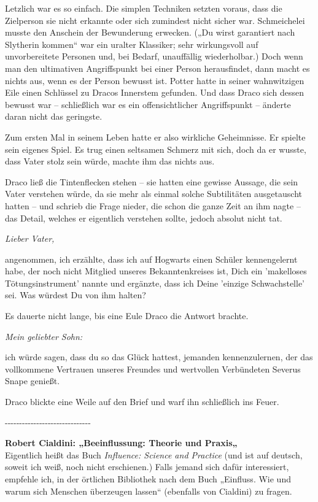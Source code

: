 {Letzlich war es so einfach. Die simplen Techniken setzten voraus, dass die Zielperson sie nicht erkannte oder sich zumindest nicht sicher war. Schmeichelei musste den Anschein der Bewunderung erwecken. („Du wirst garantiert nach Slytherin kommen“ war ein uralter Klassiker; sehr wirkungsvoll auf unvorbereitete Personen und, bei Bedarf, unauffällig wiederholbar.) Doch wenn man den ultimativen Angriffspunkt bei einer Person herausfindet, dann macht es nichts aus, wenn es der Person bewusst ist. Potter hatte in seiner wahnwitzigen Eile einen Schlüssel zu Dracos Innerstem gefunden. Und dass Draco sich dessen bewusst war -- schließlich war es ein offensichtlicher Angriffspunkt -- änderte daran nicht das geringste.

Zum ersten Mal in seinem Leben hatte er also wirkliche Geheimnisse. Er spielte sein eigenes Spiel. Es trug einen seltsamen Schmerz mit sich, doch da er wusste, dass Vater stolz sein würde, machte ihm das nichts aus.

Draco ließ die Tintenflecken stehen -- sie hatten eine gewisse Aussage, die sein Vater verstehen würde, da sie mehr als einmal solche Subtilitäten ausgetauscht hatten -- und schrieb die Frage nieder, die schon die ganze Zeit an ihm nagte -- das Detail, welches er eigentlich verstehen sollte, jedoch absolut nicht tat.

\emph{Lieber Vater,}

angenommen, ich erzählte, dass ich auf Hogwarts einen Schüler kennengelernt habe, der noch nicht Mitglied unseres Bekanntenkreises ist, Dich ein 'makelloses Tötungsinstrument' nannte und ergänzte, dass ich Deine 'einzige Schwachstelle' sei. Was würdest Du von ihm halten?

Es dauerte nicht lange, bis eine Eule Draco die Antwort brachte.

\emph{Mein geliebter Sohn:}

ich würde sagen, dass du so das Glück hattest, jemanden kennenzulernen, der das vollkommene Vertrauen unseres Freundes und wertvollen Verbündeten Severus Snape genießt.

Draco blickte eine Weile auf den Brief und warf ihn schließlich ins Feuer.

-\/-\/-\/-\/-\/-\/-\/-\/-\/-\/-\/-\/-\/-\/-\/-\/-\/-\/-\/-\/-\/-\/-\/-\/-\/-\/-\/-\/-\/-

\textbf{Robert Cialdini: „Beeinflussung: Theorie und Praxis„}\\ Eigentlich heißt das Buch \emph{Influence: Science and Practice} (und ist auf deutsch, soweit ich weiß, noch nicht erschienen.) Falls jemand sich dafür interessiert, empfehle ich, in der örtlichen Bibliothek nach dem Buch „Einfluss. Wie und warum sich Menschen überzeugen lassen“ (ebenfalls von Cialdini) zu fragen.

}
